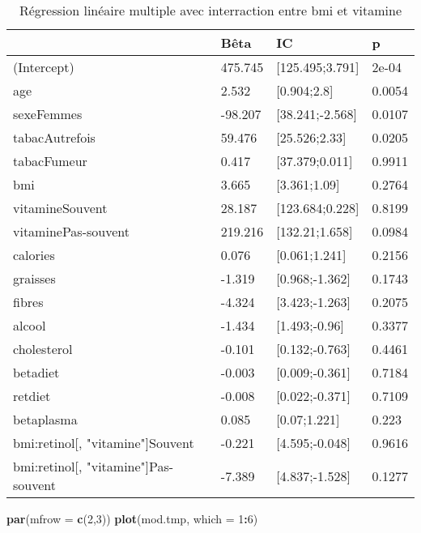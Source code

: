 \documentclass[]{article}
\newenvironment{Shaded}{\begin{snugshade}}{\end{snugshade}}
\newcommand{\KeywordTok}[1]{\textcolor[rgb]{0.13,0.29,0.53}{\textbf{#1}}}
\newcommand{\DataTypeTok}[1]{\textcolor[rgb]{0.13,0.29,0.53}{#1}}
\newcommand{\DecValTok}[1]{\textcolor[rgb]{0.00,0.00,0.81}{#1}}
\newcommand{\OperatorTok}[1]{\textcolor[rgb]{0.81,0.36,0.00}{\textbf{#1}}}
\newcommand{\NormalTok}[1]{#1}
\begin{document}
\begin{table}

\caption{\label{tab:unnamed-chunk-72}Régression linéaire multiple avec interraction entre bmi et vitamine}
\centering
\begin{tabular}[t]{l|l|l|l}
\hline
  & Bêta & IC & p\\
\hline
\rowcolor[HTML]{BBD2E1}  (Intercept) & 475.745 & [125.495;3.791] & 2e-04\\
\hline
age & 2.532 & [0.904;2.8] & 0.0054\\
\hline
\rowcolor[HTML]{BBD2E1}  sexeFemmes & -98.207 & [38.241;-2.568] & 0.0107\\
\hline
tabacAutrefois & 59.476 & [25.526;2.33] & 0.0205\\
\hline
\rowcolor[HTML]{BBD2E1}  tabacFumeur & 0.417 & [37.379;0.011] & 0.9911\\
\hline
bmi & 3.665 & [3.361;1.09] & 0.2764\\
\hline
\rowcolor[HTML]{BBD2E1}  vitamineSouvent & 28.187 & [123.684;0.228] & 0.8199\\
\hline
vitaminePas-souvent & 219.216 & [132.21;1.658] & 0.0984\\
\hline
\rowcolor[HTML]{BBD2E1}  calories & 0.076 & [0.061;1.241] & 0.2156\\
\hline
graisses & -1.319 & [0.968;-1.362] & 0.1743\\
\hline
\rowcolor[HTML]{BBD2E1}  fibres & -4.324 & [3.423;-1.263] & 0.2075\\
\hline
alcool & -1.434 & [1.493;-0.96] & 0.3377\\
\hline
\rowcolor[HTML]{BBD2E1}  cholesterol & -0.101 & [0.132;-0.763] & 0.4461\\
\hline
betadiet & -0.003 & [0.009;-0.361] & 0.7184\\
\hline
\rowcolor[HTML]{BBD2E1}  retdiet & -0.008 & [0.022;-0.371] & 0.7109\\
\hline
betaplasma & 0.085 & [0.07;1.221] & 0.223\\
\hline
\rowcolor[HTML]{BBD2E1}  bmi:retinol[, "vitamine"]Souvent & -0.221 & [4.595;-0.048] & 0.9616\\
\hline
bmi:retinol[, "vitamine"]Pas-souvent & -7.389 & [4.837;-1.528] & 0.1277\\
\hline
\end{tabular}
\end{table}

\begin{Shaded}
\begin{Highlighting}[]
\KeywordTok{par}\NormalTok{(}\DataTypeTok{mfrow =} \KeywordTok{c}\NormalTok{(}\DecValTok{2}\NormalTok{,}\DecValTok{3}\NormalTok{))}
\KeywordTok{plot}\NormalTok{(mod.tmp, }\DataTypeTok{which =} \DecValTok{1}\OperatorTok{:}\DecValTok{6}\NormalTok{)}
\end{Highlighting}
\end{Shaded}
\end{document}
